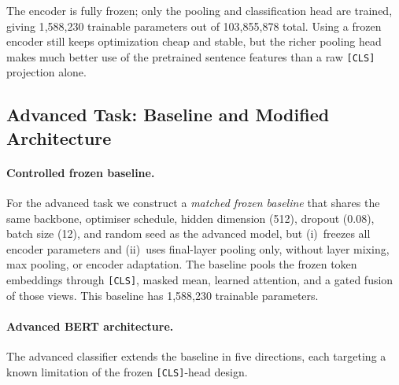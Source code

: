 \documentclass{article}
\begin{document}
The encoder is fully frozen; only the pooling and classification head are
trained, giving 1{,}588{,}230 trainable parameters out of 103{,}855{,}878
total.  Using a frozen encoder still keeps optimization cheap and stable, but
the richer pooling head makes much better use of the pretrained sentence
features than a raw \texttt{[CLS]} projection alone.

\subsection{Advanced Task: Baseline and Modified Architecture}
\label{sec:advanced}

\paragraph{Controlled frozen baseline.}
For the advanced task we construct a \emph{matched frozen baseline} that
shares the same backbone, optimiser schedule, hidden dimension (512), dropout
(0.08), batch size (12), and random seed as the advanced model, but (i)~freezes
all encoder parameters and (ii)~uses final-layer pooling only, without layer
mixing, max pooling, or encoder adaptation.  The baseline pools the frozen
token embeddings through \texttt{[CLS]}, masked mean, learned attention, and a
gated fusion of those views.  This baseline has 1{,}588{,}230 trainable
parameters.

\paragraph{Advanced BERT architecture.}
The advanced classifier extends the baseline in five directions, each targeting
a known limitation of the frozen \texttt{[CLS]}-head design.
\end{document}
